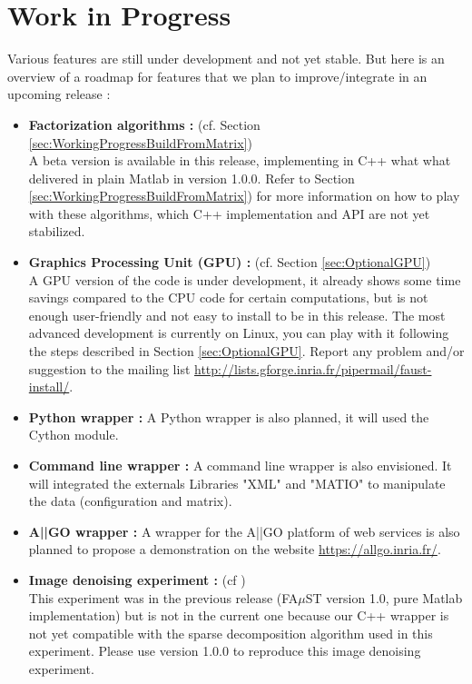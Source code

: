 \chapter{Work in Progress}\label{sec:WorkingProgress}
	Various features are still under development and not yet stable.
But here is an overview of a roadmap for features that we plan to improve/integrate in an upcoming release :
\begin{itemize}
	\item \textbf{Factorization algorithms :} (cf. Section \ref{sec:WorkingProgressBuildFromMatrix})\\ 
A beta version is available in this release, implementing in C++ what what delivered in plain Matlab in version 1.0.0. 
Refer to Section \ref{sec:WorkingProgressBuildFromMatrix}) for more information on how to play with these algorithms, which C++ implementation and API are not yet stabilized.
	\item \textbf{Graphics Processing Unit (GPU) :} (cf. Section \ref{sec:OptionalGPU})\\
A GPU version of the code is under development, it already shows 
some time savings compared to the CPU code for certain computations, but is not enough user-friendly and not easy to install to be in this release. The most advanced development is currently on Linux, you can play with it following the steps described in Section \ref{sec:OptionalGPU}. Report any problem and/or suggestion to the mailing list \url{http://lists.gforge.inria.fr/pipermail/faust-install/}. 
	\item \textbf{Python wrapper :} A Python wrapper is also planned, it will used the Cython module.
	\item \textbf{Command line wrapper :} A command line wrapper is also envisioned. It will integrated the externals Libraries "XML" and "MATIO" to manipulate the data (configuration and matrix). 
	\item \textbf{A||GO wrapper :} A wrapper for the A||GO platform of web services is also planned to propose a demonstration on the website \url{https://allgo.inria.fr/}.
		
	\item \textbf{Image denoising experiment :} (cf \cite[chapter VI]{LeMagoarou2016}) \\
This experiment was in the previous release (FA$\mu$ST version 1.0, pure Matlab implementation) but is not in the current one because our C++ wrapper is not yet compatible with the sparse decomposition algorithm used in this experiment. Please use version 1.0.0 to reproduce this image denoising experiment. 
\end{itemize}

